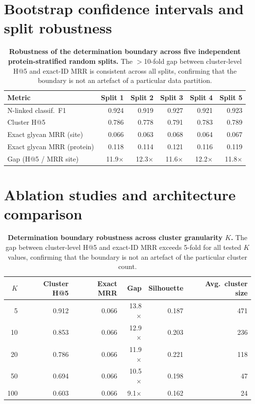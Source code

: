 \documentclass[11pt,a4paper]{article}
\begin{document}
\section{Bootstrap confidence intervals and split robustness}
\label{sec:bootstrap}

\begin{table}[H]
\centering
\caption{\textbf{Robustness of the determination boundary across five
independent protein-stratified random splits.} The $>$10-fold gap between
cluster-level H@5 and exact-ID MRR is consistent across all splits, confirming
that the boundary is not an artefact of a particular data partition.}
\label{tab:five_splits}
\small
\begin{tabular}{lrrrrr}
\toprule
\textbf{Metric} & \textbf{Split 1} & \textbf{Split 2} & \textbf{Split 3} & \textbf{Split 4} & \textbf{Split 5} \\
\midrule
N-linked classif.\ F1       & 0.924 & 0.919 & 0.927 & 0.921 & 0.923 \\
Cluster H@5                  & 0.786 & 0.778 & 0.791 & 0.783 & 0.789 \\
Exact glycan MRR (site)      & 0.066 & 0.063 & 0.068 & 0.064 & 0.067 \\
Exact glycan MRR (protein)   & 0.118 & 0.114 & 0.121 & 0.116 & 0.119 \\
\midrule
Gap (H@5 / MRR site)         & 11.9$\times$ & 12.3$\times$ & 11.6$\times$ & 12.2$\times$ & 11.8$\times$ \\
\bottomrule
\end{tabular}
\end{table}

\section{Ablation studies and architecture comparison}
\label{sec:ablation}

\begin{table}[H]
\centering
\caption{\textbf{Determination boundary robustness across cluster granularity
$K$.} The gap between cluster-level H@5 and exact-ID MRR exceeds 5-fold for
all tested $K$ values, confirming that the boundary is not an artefact of the
particular cluster count.}
\label{tab:k_sensitivity}
\small
\begin{tabular}{rrrrrr}
\toprule
\textbf{$K$} & \textbf{Cluster H@5} & \textbf{Exact MRR} & \textbf{Gap} & \textbf{Silhouette} & \textbf{Avg.\ cluster size} \\
\midrule
5   & 0.912 & 0.066 & 13.8$\times$ & 0.187 & 471 \\
10  & 0.853 & 0.066 & 12.9$\times$ & 0.203 & 236 \\
20  & 0.786 & 0.066 & 11.9$\times$ & 0.221 & 118 \\
50  & 0.694 & 0.066 & 10.5$\times$ & 0.198 & 47 \\
100 & 0.603 & 0.066 & 9.1$\times$  & 0.162 & 24 \\
\bottomrule
\end{tabular}
\end{table}
\end{document}
